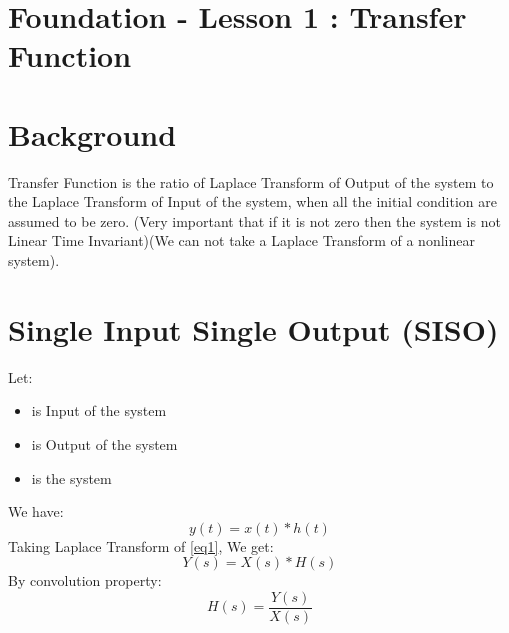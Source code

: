 \documentclass[12pt,a4paper]{article}
\begin{document}
	\section*{\centering Foundation - Lesson 1 : Transfer Function}
	\section{Background}
	Transfer Function is the ratio of Laplace Transform of Output of the system to the Laplace Transform of Input of the system, when all the initial condition are assumed to be zero. (Very important that if it is not zero then the system is not Linear Time Invariant)(We can not take a Laplace Transform of a nonlinear system).
	\section{Single Input Single Output (SISO)}
	Let:
	\begin{itemize}
		\item { is Input of the system}
		\item { is Output of the system}
		\item { is the system}
	\end{itemize}
	We have:
	\begin{equation}
		y(t) = x(t)*h(t)
		\label{eq1}
	\end{equation}
	Taking Laplace Transform of \autoref{eq1}, We get:
	\begin{equation}
		Y(s) = X(s)*H(s)
		\label{eq2}
	\end{equation}
	By convolution property:
	\begin{equation}
		\boxed{
			H(s) = \frac{Y(s)}{X(s)}
		}
		\label{eq3}
	\end{equation}
	
	
\end{document}

